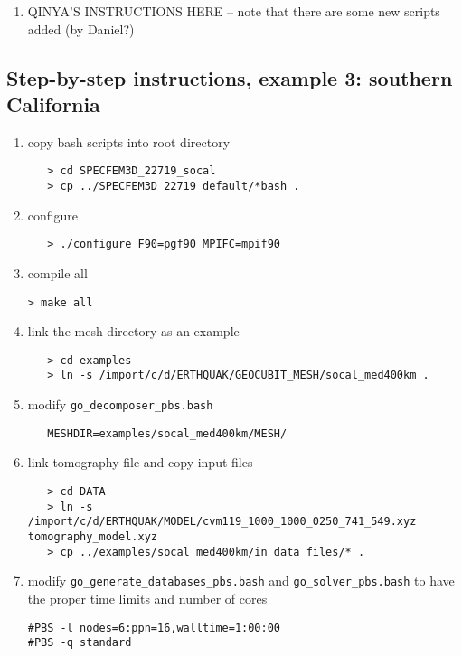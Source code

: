 \documentclass[10pt,titlepage,fleqn]{article}
\begin{document}
\begin{enumerate}
\item QINYA'S INSTRUCTIONS HERE -- note that there are some new scripts added (by Daniel?)
\end{enumerate}


\subsection*{Step-by-step instructions, example 3: southern California}

\begin{enumerate}
\item copy bash scripts into root directory

\begin{verbatim}
   > cd SPECFEM3D_22719_socal
   > cp ../SPECFEM3D_22719_default/*bash .
\end{verbatim}

\item configure
\begin{verbatim}
   > ./configure F90=pgf90 MPIFC=mpif90
\end{verbatim}

\item compile all
\begin{verbatim}
> make all
\end{verbatim}

\item link the mesh directory as an example
\begin{verbatim}
   > cd examples
   > ln -s /import/c/d/ERTHQUAK/GEOCUBIT_MESH/socal_med400km .
\end{verbatim}

\item modify \verb+go_decomposer_pbs.bash+
\begin{verbatim}
   MESHDIR=examples/socal_med400km/MESH/
\end{verbatim}

\item link tomography file and copy input files
\begin{verbatim}
   > cd DATA
   > ln -s /import/c/d/ERTHQUAK/MODEL/cvm119_1000_1000_0250_741_549.xyz tomography_model.xyz
   > cp ../examples/socal_med400km/in_data_files/* .
\end{verbatim}

\item modify \verb+go_generate_databases_pbs.bash+ and \verb+go_solver_pbs.bash+ to have the proper time limits and number of cores
\begin{verbatim}
#PBS -l nodes=6:ppn=16,walltime=1:00:00
#PBS -q standard
\end{verbatim}


\end{enumerate}
\end{document}
